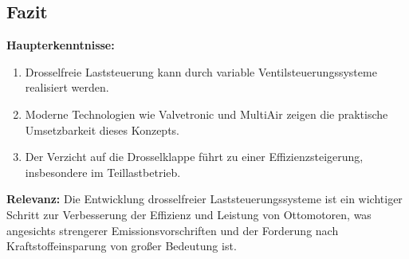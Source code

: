 \documentclass[a4paper,12pt]{article}
\begin{document}
\subsection{Fazit}

\textbf{Haupterkenntnisse:}

\begin{enumerate}
    \item Drosselfreie Laststeuerung kann durch variable Ventilsteuerungssysteme realisiert werden.
    \item Moderne Technologien wie Valvetronic und MultiAir zeigen die praktische Umsetzbarkeit dieses Konzepts.
    \item Der Verzicht auf die Drosselklappe führt zu einer Effizienzsteigerung, insbesondere im Teillastbetrieb.
\end{enumerate}

\textbf{Relevanz:} Die Entwicklung drosselfreier Laststeuerungssysteme ist ein wichtiger Schritt zur Verbesserung der Effizienz und Leistung von Ottomotoren, was angesichts strengerer Emissionsvorschriften und der Forderung nach Kraftstoffeinsparung von großer Bedeutung ist.


\printbibliography[
    title=Literaturverzeichnis,
    heading=bibintoc
]
\end{document}
